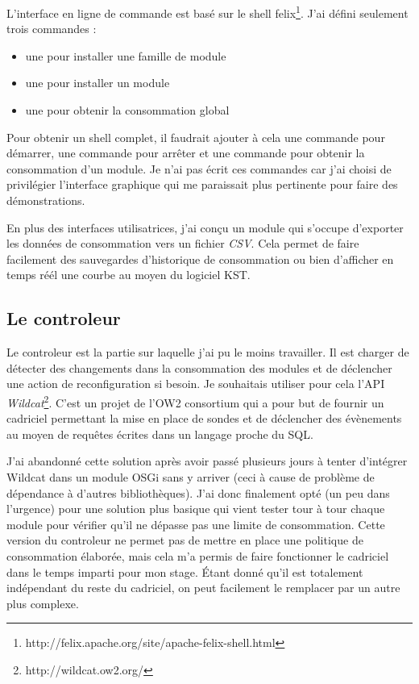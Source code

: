 \documentclass[a4paper, 11pt]{report}
\begin{document}
L'interface en ligne de commande est basé sur le shell felix\footnote{http://felix.apache.org/site/apache-felix-shell.html}. J'ai défini seulement trois commandes :
\begin{itemize}
  \item une pour installer une famille de module
  \item une pour installer un module
  \item une pour obtenir la consommation global
\end{itemize}
Pour obtenir un shell complet, il faudrait ajouter à cela une commande pour démarrer, une commande pour arrêter et une commande pour obtenir la consommation d'un module. Je n'ai pas écrit ces commandes car j'ai choisi de privilégier l'interface graphique qui me paraissait plus pertinente pour faire des démonstrations.

En plus des interfaces utilisatrices, j'ai conçu un module qui s'occupe d'exporter les données de consommation vers un fichier \textit{CSV}. Cela permet de faire facilement des sauvegardes d'historique de consommation ou bien d'afficher en temps réél une courbe au moyen du logiciel KST.
 
		\subsection{Le controleur}
Le controleur est la partie sur laquelle j'ai pu le moins travailler. Il est charger de détecter des changements dans la consommation des modules et de déclencher une action de reconfiguration si besoin. Je souhaitais utiliser pour cela l'API \textit{Wildcat}\footnote{http://wildcat.ow2.org/}. C'est un projet de l'OW2 consortium qui a pour but de fournir un cadriciel permettant la mise en place de sondes et de déclencher des évènements au moyen de requêtes écrites dans un langage proche du SQL.

J'ai abandonné cette solution après avoir passé plusieurs jours à tenter d'intégrer Wildcat dans un module OSGi sans y arriver (ceci  à cause de problème de dépendance à d'autres bibliothèques). J'ai donc finalement opté (un peu dans l'urgence) pour une solution plus basique qui vient tester tour à tour chaque module pour vérifier qu'il ne dépasse pas une limite de consommation. Cette version du controleur ne permet pas de mettre en place une politique de consommation élaborée, mais cela m'a permis de faire fonctionner le cadriciel dans le temps imparti pour mon stage. Étant donné qu'il est totalement indépendant du reste du cadriciel, on peut facilement le remplacer par un autre plus complexe.
   
\end{document}
